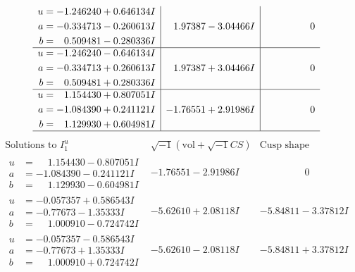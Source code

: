 \documentclass[1p]{elsarticle_modified}
\theoremstyle{definition}
\newcommand{\I}{\sqrt{-1}}
\begin{document}
$$\begin{array}{c|c|c}
\begin{aligned}
u &= -1.246240 + 0.646134 I \\
a &= -0.334713 - 0.260613 I \\
b &= \phantom{-}0.509481 - 0.280336 I\end{aligned}
 & \phantom{-}1.97387 - 3.04466 I & \phantom{-0.000000 } 0 \\ \hline\begin{aligned}
u &= -1.246240 - 0.646134 I \\
a &= -0.334713 + 0.260613 I \\
b &= \phantom{-}0.509481 + 0.280336 I\end{aligned}
 & \phantom{-}1.97387 + 3.04466 I & \phantom{-0.000000 } 0 \\ \hline\begin{aligned}
u &= \phantom{-}1.154430 + 0.807051 I \\
a &= -1.084390 + 0.241121 I \\
b &= \phantom{-}1.129930 + 0.604981 I\end{aligned}
 & -1.76551 + 2.91986 I & \phantom{-0.000000 } 0\\
 \hline 
 \end{array}$$\newpage$$\begin{array}{c|c|c}  
\text{Solutions to }I^u_{1}& \I (\text{vol} + \sqrt{-1}CS) & \text{Cusp shape}\\
 \hline 
\begin{aligned}
u &= \phantom{-}1.154430 - 0.807051 I \\
a &= -1.084390 - 0.241121 I \\
b &= \phantom{-}1.129930 - 0.604981 I\end{aligned}
 & -1.76551 - 2.91986 I & \phantom{-0.000000 } 0 \\ \hline\begin{aligned}
u &= -0.057357 + 0.586543 I \\
a &= -0.77673 - 1.35333 I \\
b &= \phantom{-}1.000910 - 0.724742 I\end{aligned}
 & -5.62610 + 2.08118 I & -5.84811 - 3.37812 I \\ \hline\begin{aligned}
u &= -0.057357 - 0.586543 I \\
a &= -0.77673 + 1.35333 I \\
b &= \phantom{-}1.000910 + 0.724742 I\end{aligned}
 & -5.62610 - 2.08118 I & -5.84811 + 3.37812 I \\ \hline\begin{aligned}

\end{aligned}
\end{array}$$
\end{document}
